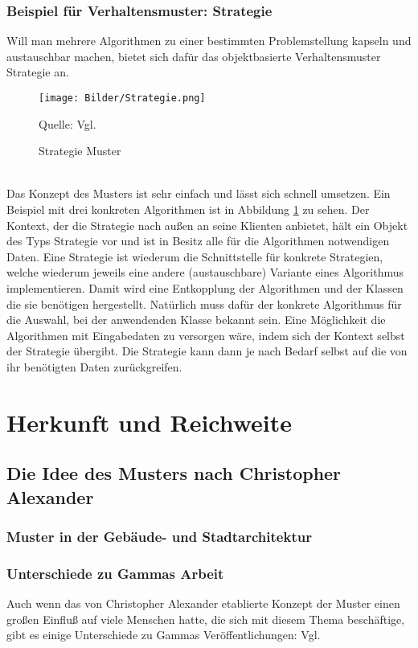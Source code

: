 \documentclass[fontsize=11pt,a4paper,final]{scrreprt}[2003/01/01]
\makeatletter
\def\ScaleIfNeeded{%
	\ifdim\Gin@nat@width>\linewidth
		\linewidth
	\else
		\Gin@nat@width
	\fi
}
\newcommand*{\quelle}{%
	\footnotesize Quelle: 
}
\makeatother
\begin{document}
\subsection{Beispiel für Verhaltensmuster: Strategie}
Will man mehrere Algorithmen zu einer bestimmten Problemstellung kapseln und austauschbar machen, bietet sich dafür das objektbasierte Verhaltensmuster Strategie an.

\begin{figure}[H]
	\centering
	\texttt{[image: Bilder/Strategie.png]}
	\caption{Strategie Muster}
	\quelle{Vgl. \cite[S. 375]{gamma2004}} 
	\label{fig:Strategie}
\end{figure}
\ \\
Das Konzept des Musters ist sehr einfach und lässt sich schnell umsetzen. Ein Beispiel mit drei konkreten Algorithmen ist in Abbildung \ref{fig:Strategie} zu sehen. Der Kontext, der die Strategie nach außen an seine Klienten anbietet, hält ein Objekt des Typs Strategie vor und ist in Besitz alle für die Algorithmen notwendigen Daten. Eine Strategie ist wiederum die Schnittstelle für konkrete Strategien, welche wiederum jeweils eine andere (austauschbare) Variante eines Algorithmus implementieren. Damit wird eine Entkopplung der Algorithmen und der Klassen die sie benötigen hergestellt. Natürlich muss dafür der konkrete Algorithmus für die Auswahl, bei der anwendenden Klasse bekannt sein. Eine Möglichkeit die Algorithmen mit Eingabedaten zu versorgen wäre, indem sich der Kontext selbst der Strategie übergibt. Die Strategie kann dann je nach Bedarf selbst auf die von ihr benötigten Daten zurückgreifen.

\chapter{Herkunft und Reichweite}\label{Muster}

\section{Die Idee des Musters nach Christopher Alexander}

\subsection{Muster in der Gebäude- und Stadtarchitektur}

\subsection{Unterschiede zu Gammas Arbeit}
Auch wenn das von Christopher Alexander etablierte Konzept der Muster einen großen Einfluß auf viele Menschen hatte, die sich mit diesem Thema beschäftige, gibt es einige Unterschiede zu Gammas Veröffentlichungen: Vgl. \cite[S. 438 - 439]{gamma2004}
\end{document}
